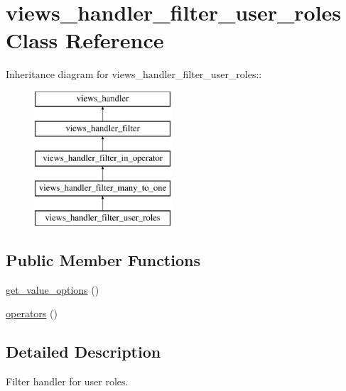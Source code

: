 \hypertarget{classviews__handler__filter__user__roles}{
\section{views\_\-handler\_\-filter\_\-user\_\-roles Class Reference}
\label{classviews__handler__filter__user__roles}
}
Inheritance diagram for views\_\-handler\_\-filter\_\-user\_\-roles::\begin{figure}[H]
\begin{center}
\leavevmode
\includegraphics[height=5cm]{classviews__handler__filter__user__roles}
\end{center}
\end{figure}
\subsection*{Public Member Functions}
\begin{DoxyCompactItemize}
\item 
\hyperlink{classviews__handler__filter__user__roles_a9fcc092575dde958d1b50bb05c0243a3}{get\_\-value\_\-options} ()
\item 
\hyperlink{classviews__handler__filter__user__roles_a9ec9e9b4e15492709ed2be2951dc6d19}{operators} ()
\end{DoxyCompactItemize}


\subsection{Detailed Description}
Filter handler for user roles. 

